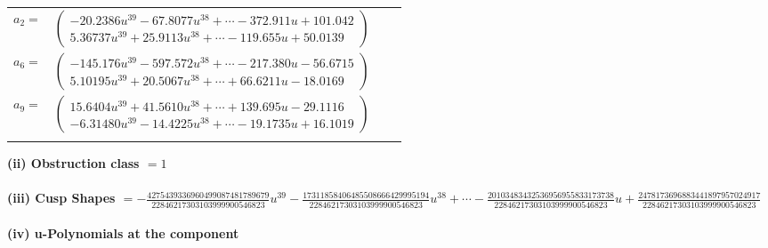\documentclass[1p]{elsarticle_modified}
\theoremstyle{definition}
\begin{document}
\begin{tabular}{m{7pt} m{180pt} m{7pt} m{180pt} }
\flushright $a_{2}=$&$\begin{pmatrix}-20.2386 u^{39}-67.8077 u^{38}+\cdots-372.911 u+101.042\\5.36737 u^{39}+25.9113 u^{38}+\cdots-119.655 u+50.0139\end{pmatrix}$ \\
\flushright $a_{6}=$&$\begin{pmatrix}-145.176 u^{39}-597.572 u^{38}+\cdots-217.380 u-56.6715\\5.10195 u^{39}+20.5067 u^{38}+\cdots+66.6211 u-18.0169\end{pmatrix}$ \\
\flushright $a_{9}=$&$\begin{pmatrix}15.6404 u^{39}+41.5610 u^{38}+\cdots+139.695 u-29.1116\\-6.31480 u^{39}-14.4225 u^{38}+\cdots-19.1735 u+16.1019\end{pmatrix}$\\&\end{tabular}
\flushleft \textbf{(ii) Obstruction class $= 1$}\\~\\
\flushleft \textbf{(iii) Cusp Shapes $= -\frac{4275439336960499087481789679}{22846217303103999900546823} u^{39}-\frac{17311858406485508666429995194}{22846217303103999900546823} u^{38}+\cdots-\frac{20103483432536956955833173738}{22846217303103999900546823} u+\frac{2478173696883441897957024917}{22846217303103999900546823}$}\\~\\
\newpage\renewcommand{\arraystretch}{1}
\flushleft \textbf{(iv) u-Polynomials at the component}\newline \\
\end{document}
